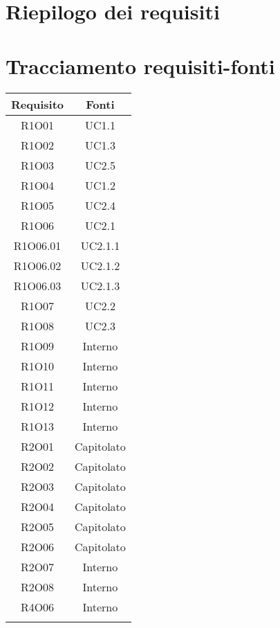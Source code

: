 \section{Riepilogo dei requisiti}

\section{Tracciamento requisiti-fonti}
\begin{tabularx}{\textwidth}{|C|C|}
	\hline
	\textbf{Requisito} & \textbf{Fonti} \\
	\hline
	R1O01& UC1.1\\
	\hline
	R1O02& UC1.3\\
	\hline
	R1O03& UC2.5\\
	\hline
	R1O04& UC1.2\\
	\hline
	R1O05& UC2.4\\
	\hline
	R1O06& UC2.1\\
	\hline
	R1O06.01& UC2.1.1\\
	\hline
	R1O06.02& UC2.1.2\\
	\hline
	R1O06.03& UC2.1.3\\
	\hline
	R1O07& UC2.2\\
	\hline	
	R1O08& UC2.3\\
	\hline	
	R1O09& Interno\\
	\hline	
	R1O10& Interno\\
	\hline
	R1O11& Interno\\
	\hline	
	R1O12& Interno\\
	\hline
	R1O13& Interno\\
	\hline
	R2O01 &Capitolato\\
	\hline
	R2O02 &Capitolato\\
	\hline
	R2O03 &Capitolato\\
	\hline
	R2O04 &Capitolato\\
	\hline
	R2O05 &Capitolato\\
	\hline
	R2O06 &Capitolato\\
	\hline
	R2O07 &Interno\\
	\hline
	R2O08 &Interno\\
	\hline
	R4O06 &Interno\\
	\hline
	
	\caption{Tabella requisiti-fonti}
\end{tabularx}